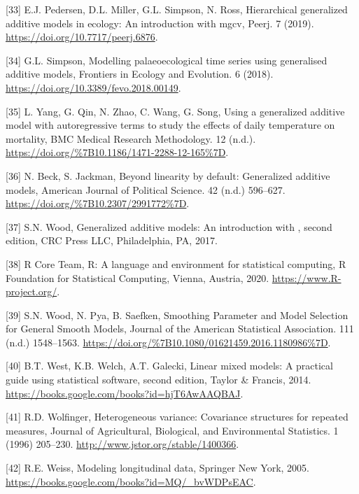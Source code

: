 \documentclass[
]{article}
\begin{document}
\leavevmode\hypertarget{ref-pedersen2019}{}%
{[}33{]} E.J. Pedersen, D.L. Miller, G.L. Simpson, N. Ross, Hierarchical generalized additive models in ecology: An introduction with mgcv, Peerj. 7 (2019). \url{https://doi.org/10.7717/peerj.6876}.

\leavevmode\hypertarget{ref-simpson2018}{}%
{[}34{]} G.L. Simpson, Modelling palaeoecological time series using generalised additive models, Frontiers in Ecology and Evolution. 6 (2018). \url{https://doi.org/10.3389/fevo.2018.00149}.

\leavevmode\hypertarget{ref-yang2012}{}%
{[}35{]} L. Yang, G. Qin, N. Zhao, C. Wang, G. Song, Using a generalized additive model with autoregressive terms to study the effects of daily temperature on mortality, BMC Medical Research Methodology. 12 (n.d.). \url{https://doi.org/\%7B10.1186/1471-2288-12-165\%7D}.

\leavevmode\hypertarget{ref-beck1998}{}%
{[}36{]} N. Beck, S. Jackman, Beyond linearity by default: Generalized additive models, American Journal of Political Science. 42 (n.d.) 596--627. \url{https://doi.org/\%7B10.2307/2991772\%7D}.

\leavevmode\hypertarget{ref-wood2017}{}%
{[}37{]} S.N. Wood, Generalized additive models: An introduction with , second edition, CRC Press LLC, Philadelphia, PA, 2017.

\leavevmode\hypertarget{ref-r}{}%
{[}38{]} R Core Team, R: A language and environment for statistical computing, R Foundation for Statistical Computing, Vienna, Austria, 2020. \url{https://www.R-project.org/}.

\leavevmode\hypertarget{ref-wood2016}{}%
{[}39{]} S.N. Wood, N. Pya, B. Saefken, Smoothing Parameter and Model Selection for General Smooth Models, Journal of the American Statistical Association. 111 (n.d.) 1548--1563. \url{https://doi.org/\%7B10.1080/01621459.2016.1180986\%7D}.

\leavevmode\hypertarget{ref-west2014}{}%
{[}40{]} B.T. West, K.B. Welch, A.T. Galecki, Linear mixed models: A practical guide using statistical software, second edition, Taylor \& Francis, 2014. \url{https://books.google.com/books?id=hjT6AwAAQBAJ}.

\leavevmode\hypertarget{ref-wolfinger1996}{}%
{[}41{]} R.D. Wolfinger, Heterogeneous variance: Covariance structures for repeated measures, Journal of Agricultural, Biological, and Environmental Statistics. 1 (1996) 205--230. \url{http://www.jstor.org/stable/1400366}.

\leavevmode\hypertarget{ref-weiss2005}{}%
{[}42{]} R.E. Weiss, Modeling longitudinal data, Springer New York, 2005. \url{https://books.google.com/books?id=MQ/_bvWDPsEAC}.
\end{document}
